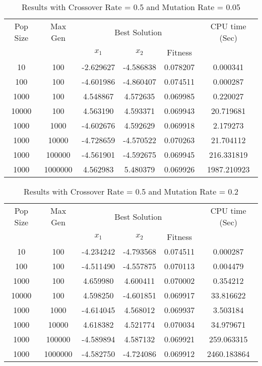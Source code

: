 \documentclass[12pt]{article}
\begin{document}
    \begin{table}[h!]
		\caption{Results with Crossover Rate = 0.5 and Mutation Rate = 0.05}
		\label{table:1}
		\centering
		\begin{tabular}{c c c c c c}
			\hline
			Pop Size & Max Gen & \multicolumn{3}{c}{Best Solution} & CPU time (Sec) \\
			& & $x_1$ & $x_2$ & Fitness & \\
			\hline
            10  & 100    & -2.629627 & -4.586838 & 0.078207 & 0.000341 \\
			100 & 100    & -4.601986 & -4.860407 & 0.074511 & 0.000287 \\
			1000& 100    & 4.548867 & 4.572635 & 0.069985 & 0.220027 \\
			10000& 100    & 4.563190 & 4.593371 & 0.069943 & 20.719681 \\
			\hline
			1000  & 1000   & -4.602676 & 4.592629 & 0.069918 & 2.179273 \\
			1000 & 10000  & -4.728659 & -4.570522 & 0.070263 & 21.704112 \\
			1000& 100000 & -4.561901 & -4.592675 & 0.069945 & 216.331819 \\
			1000& 1000000 & 4.562983 & 5.480379 & 0.069926 & 1987.210923 \\ 
			\hline
		\end{tabular}
	\end{table}

	\begin{table}[h!]
		\caption{Results with Crossover Rate = 0.5 and Mutation Rate = 0.2}
		\label{table:1}
		\centering
		\begin{tabular}{c c c c c c}
			\hline
			Pop Size & Max Gen & \multicolumn{3}{c}{Best Solution} & CPU time (Sec) \\
			& & $x_1$ & $x_2$ & Fitness & \\
			\hline
			10  & 100    & -4.234242 & -4.793568 & 0.074511 & 0.000287 \\
			100 & 100   & -4.511490 & -4.557875 & 0.070113 & 0.004479 \\
			1000& 100    & 4.659980 & 4.600411 & 0.070002 & 0.354212 \\
			10000& 100    & 4.598250 & -4.601851 & 0.069917 & 33.816622 \\
			\hline
			1000  & 1000   & -4.614045 & 4.568012 & 0.069937 & 3.503184 \\
			1000 & 10000  & 4.618382 & 4.521774 & 0.070034 & 34.979671 \\
			1000& 100000 & -4.589894 & 4.587132 & 0.069921 & 259.063315 \\
			1000& 1000000 & -4.582750 & -4.724086 & 0.069912 & 2460.183864 \\
			\hline
		\end{tabular}
	\end{table}
	
		
\end{document}
